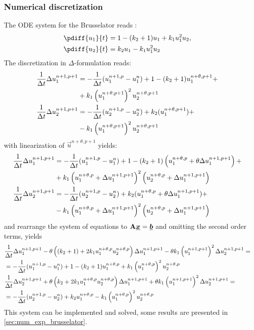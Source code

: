 \subsubsection{Numerical discretization}\label{sec:brusselator_discretization}

The  ODE system for the Brusselator reads \citep[eq.\ 14,15]{AultHolmgreen2003}:
\begin{align}
    \pdiff{u_1}{t} & = 1 - (k_2 + 1) u_1 + k_1 u_1^2 u_2,
    \\
    \pdiff{u_2}{t} & = k_2 u_1 - k_1 u_1^2 u_2
\end{align}
The discretization in $\Delta$-formulation reads:
\begin{align}
    \frac{1}{\Delta t}\Delta u_1^{n+1, p+1} & = - \frac{1}{\Delta t}(u_1^{n+1,p} - u_1^n) + 1 - (k_2 +1) u_1^{n+\theta,p+1} +
    \nonumber \\*
    &  + k_1 \left(u_1^{n+\theta,p+1}\right)^2 u_2^{n+\theta,p+1}
    \\
    \frac{1}{\Delta t}\Delta u_2^{n+1, p+1} & = - \frac{1}{\Delta t}(u_2^{n+1,p} - u_2^n) + k_2(u_1^{n+\theta,p+1})  +
    \nonumber \\*
    & - k_1 \left(u_1^{n+\theta,p+1}\right)^2 u_2^{n+\theta,p+1}
\end{align}
with linearization of $\vec{u}^{n+\theta,p+1}$ yields:
\begin{align}
    \frac{1}{\Delta t}\Delta u_1^{n+1, p+1} & =
    - \frac{1}{\Delta t}(u_1^{n+1,p} - u_1^n) + 1 - (k_2 +1) \left(u_1^{n+\theta,p} + \theta \Delta u_1^{n+1, p+1}\right)+
    \nonumber \\*
    &  + k_1 \left(u_1^{n+\theta,p}+\Delta u_1^{n+1, p+1}\right)^2 \left(u_2^{n+\theta,p}+ \Delta u_1^{n+1, p+1}\right)
    \\
    \frac{1}{\Delta t}\Delta u_2^{n+1, p+1} & = - \frac{1}{\Delta t}(u_2^{n+1,p} - u_2^n) + k_2 (u_1^{n+\theta,p} + \theta \Delta u_1^{n+1, p+1}) +
    \nonumber \\*
    &
    - k_1 \left(u_1^{n+\theta,p}+\Delta u_1^{n+1, p+1}\right)^2 \left(u_2^{n+\theta,p}+ \Delta u_1^{n+1, p+1}\right)
\end{align}
and rearrange the system of equations to $\mbox{\boldmath ${\mathrm{A}}$}\mbox{\boldmath $\underline{x}$}=\mbox{\boldmath $\underline{b}$}$ and omitting the second order terms, yields
\begin{align}
    &\frac{1}{\Delta t}\Delta u_1^{n+1, p+1}
    - \theta \left(\left(k_2 +1\right) + 2  k_1 u_1^{n+\theta,p} u_2^{n+\theta,p}\right)\Delta u_1 ^{n+1, p+1}
    - \theta k_1 \left(u_1^{n+1, p+1}\right)^2 \Delta u_2 ^{n+1, p+1} =
    \nonumber \\*
    & = - \frac{1}{\Delta t}(u_1^{n+1,p} - u_1^n) + 1 - (k_2 +1) u_1^{n+\theta,p} + k_1 \left(u_1^{n+\theta,p}\right)^2 u_2^{n+\theta,p}
    \\
    & \frac{1}{\Delta t}\Delta u_2^{n+1, p+1}
    + \theta \left( k_2 + 2 k_1 u_1^{n+\theta,p} u_2^{n+\theta,p} \right) \Delta u_1 ^{n+1, p+1}
    + \theta k_1\left(u_1^{n+1, p+1}\right)^2 \Delta u_2 ^{n+1, p+1}
    = \nonumber \\*
    & =- \frac{1}{\Delta t}(u_2^{n+1,p} - u_2^n) + k_2 u_1^{n+\theta,p}
    - k_1 \left(u_1^{n+\theta,p}\right)^2 u_2^{n+\theta,p}
\end{align}
This system can be implemented and solved, some results are presented in \autoref{sec:num_exp_brusselator}.
